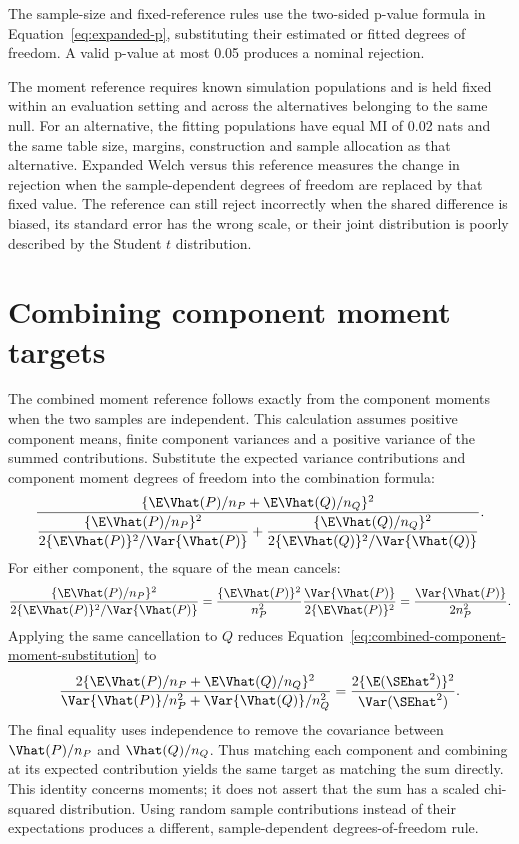 The sample-size and fixed-reference rules use the two-sided p-value
formula in Equation~\eqref{eq:expanded-p}, substituting their estimated
or fitted degrees of freedom. A valid p-value at most 0.05 produces a
nominal rejection.

The moment reference requires known simulation populations and is held
fixed within an evaluation setting and across the alternatives belonging
to the same null. For an alternative, the fitting populations have equal
MI of 0.02 nats and the same table size, margins, construction and sample
allocation as that alternative. Expanded Welch versus this reference measures the
change in rejection when the sample-dependent degrees of freedom are
replaced by that fixed value. The reference can still reject incorrectly
when the shared difference is biased, its standard error has the wrong
scale, or their joint distribution is poorly described by the Student
\(t\) distribution.

\section{Combining component moment targets}
\label{sec:combined-moment-identity}

The combined moment reference follows exactly from the component moments
when the two samples are independent. This calculation assumes positive
component means, finite component variances and a positive variance of
the summed contributions. Substitute the expected variance contributions
and component moment degrees of freedom into the combination formula:
\begin{equation}
 \frac{\{\E\Vhat(P)/n_P+\E\Vhat(Q)/n_Q\}^{2}}
 {\dfrac{\{\E\Vhat(P)/n_P\}^{2}}
              {2\{\E\Vhat(P)\}^{2}/\Var\{\Vhat(P)\}}
 +\dfrac{\{\E\Vhat(Q)/n_Q\}^{2}}
              {2\{\E\Vhat(Q)\}^{2}/\Var\{\Vhat(Q)\}}}.
 \label{eq:combined-component-moment-substitution}
\end{equation}
For either component, the square of the mean cancels:
\begin{equation}
 \frac{\{\E\Vhat(P)/n_P\}^{2}}
 {2\{\E\Vhat(P)\}^{2}/\Var\{\Vhat(P)\}}
 =\frac{\{\E\Vhat(P)\}^{2}}{n_P^2}
  \frac{\Var\{\Vhat(P)\}}{2\{\E\Vhat(P)\}^{2}}
 =\frac{\Var\{\Vhat(P)\}}{2n_P^2}.
\end{equation}
Applying the same cancellation to \(Q\) reduces
Equation~\eqref{eq:combined-component-moment-substitution} to
\begin{equation}
 \frac{2\{\E\Vhat(P)/n_P+\E\Vhat(Q)/n_Q\}^{2}}
 {\Var\{\Vhat(P)\}/n_P^2+\Var\{\Vhat(Q)\}/n_Q^2}
 =\frac{2\{\E(\SEhat^2)\}^{2}}{\Var(\SEhat^2)}.
\end{equation}
The final equality uses independence to remove the covariance between
\(\Vhat(P)/n_P\) and \(\Vhat(Q)/n_Q\). Thus matching each component
and combining at its expected contribution yields the same target as
matching the sum directly. This identity concerns moments; it does not
assert that the sum has a scaled chi-squared distribution. Using random
sample contributions instead of their expectations produces a different,
sample-dependent degrees-of-freedom rule.

